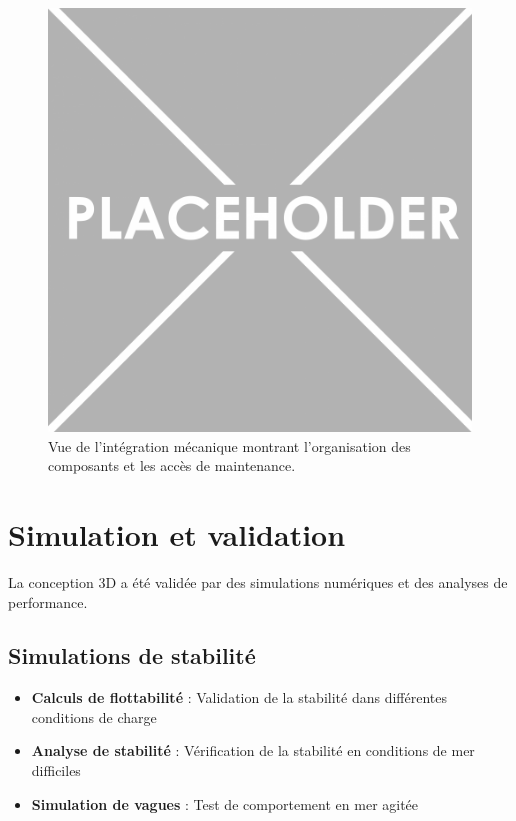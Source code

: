 {\begin{figure}[!htpb]
    \centering
    \includegraphics[width=0.7\linewidth]{Figures/PezizaTuberosa.jpg}
    \caption[Intégration mécanique]{Vue de l'intégration mécanique montrant l'organisation des composants et les accès de maintenance.}
    \label{fig:integration-mecanique}
\end{figure}

\section{Simulation et validation}
La conception 3D a été validée par des simulations numériques et des analyses de performance.

\subsection{Simulations de stabilité}
\begin{itemize}
    \setlength{\itemsep}{.375em}
    \item \textbf{Calculs de flottabilité} : Validation de la stabilité dans différentes conditions de charge
    \item \textbf{Analyse de stabilité} : Vérification de la stabilité en conditions de mer difficiles
    \item \textbf{Simulation de vagues} : Test de comportement en mer agitée
\end{itemize}

}
